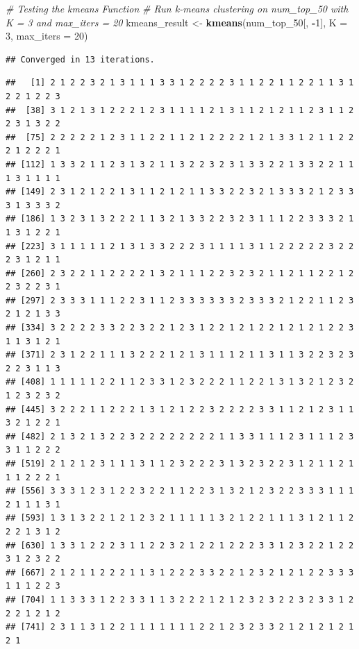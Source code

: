 \documentclass[
]{article}
\newenvironment{Shaded}{\begin{snugshade}}{\end{snugshade}}
\newcommand{\AttributeTok}[1]{\textcolor[rgb]{0.13,0.29,0.53}{#1}}
\newcommand{\CommentTok}[1]{\textcolor[rgb]{0.56,0.35,0.01}{\textit{#1}}}
\newcommand{\DecValTok}[1]{\textcolor[rgb]{0.00,0.00,0.81}{#1}}
\newcommand{\FunctionTok}[1]{\textcolor[rgb]{0.13,0.29,0.53}{\textbf{#1}}}
\newcommand{\NormalTok}[1]{#1}
\newcommand{\OtherTok}[1]{\textcolor[rgb]{0.56,0.35,0.01}{#1}}
\newcommand{\SpecialCharTok}[1]{\textcolor[rgb]{0.81,0.36,0.00}{\textbf{#1}}}
\begin{document}
\begin{Shaded}
\begin{Highlighting}[]
\CommentTok{\# Testing the kmeans Function}
\CommentTok{\# Run k{-}means clustering on num\_top\_50 with K = 3 and max\_iters = 20}
\NormalTok{kmeans\_result }\OtherTok{\textless{}{-}} \FunctionTok{kmeans}\NormalTok{(num\_top\_50[, }\SpecialCharTok{{-}}\DecValTok{1}\NormalTok{], }\AttributeTok{K =} \DecValTok{3}\NormalTok{, }\AttributeTok{max\_iters =} \DecValTok{20}\NormalTok{)}
\end{Highlighting}
\end{Shaded}

\begin{verbatim}
## Converged in 13 iterations.
\end{verbatim}

\begin{Shaded}
\end{Shaded}

\begin{verbatim}
##   [1] 2 1 2 2 3 2 1 3 1 1 1 3 3 1 2 2 2 2 3 1 1 2 2 1 1 2 2 1 1 3 1 2 2 1 2 2 3
##  [38] 3 1 2 1 3 1 2 2 2 1 2 3 1 1 1 1 2 1 3 1 1 2 1 2 1 1 2 3 1 1 2 2 3 1 3 2 2
##  [75] 2 2 2 2 2 1 2 3 1 1 2 2 1 1 2 1 2 2 2 2 1 2 1 3 3 1 2 1 1 2 2 2 1 2 2 2 1
## [112] 1 3 3 2 1 1 2 3 1 3 2 1 1 3 2 2 3 2 3 1 3 3 2 2 1 3 3 2 2 1 1 1 3 1 1 1 1
## [149] 2 3 1 2 1 2 2 1 3 1 1 2 1 2 1 1 3 3 2 2 3 2 1 3 3 3 2 1 2 3 3 3 1 3 3 3 2
## [186] 1 3 2 3 1 3 2 2 2 1 1 3 2 1 3 3 2 2 3 2 3 1 1 1 2 2 3 3 3 2 1 1 3 1 2 2 1
## [223] 3 1 1 1 1 1 2 1 3 1 3 3 2 2 2 3 1 1 1 1 3 1 1 2 2 2 2 2 3 2 2 2 3 1 2 1 1
## [260] 2 3 2 2 1 1 2 2 2 2 1 3 2 1 1 1 2 2 3 2 3 2 1 1 2 1 1 2 2 1 2 2 3 2 2 3 1
## [297] 2 3 3 3 1 1 1 2 2 3 1 1 2 3 3 3 3 3 3 2 3 3 3 2 1 2 2 1 1 2 3 2 1 2 1 3 3
## [334] 3 2 2 2 2 3 3 2 2 3 2 2 1 2 3 1 2 2 1 2 1 2 2 1 2 1 2 1 2 2 3 1 1 3 1 2 1
## [371] 2 3 1 2 2 1 1 1 3 2 2 2 1 2 1 3 1 1 1 2 1 1 3 1 1 3 2 2 3 2 3 2 2 3 1 1 3
## [408] 1 1 1 1 1 2 2 1 1 2 3 3 1 2 3 2 2 2 1 1 2 2 1 3 1 3 2 1 2 3 2 1 2 3 2 3 2
## [445] 3 2 2 2 1 1 2 2 2 1 3 1 2 1 2 2 3 2 2 2 2 3 3 1 1 2 1 2 3 1 1 3 2 1 2 2 1
## [482] 2 1 3 2 1 3 2 2 3 2 2 2 2 2 2 2 2 1 1 3 3 1 1 1 2 3 1 1 1 2 3 3 1 1 2 2 2
## [519] 2 1 2 1 2 3 1 1 1 3 1 1 2 3 2 2 2 3 1 3 2 3 2 2 3 1 2 1 1 2 1 1 1 2 2 2 1
## [556] 3 3 3 1 2 3 1 2 2 3 2 2 1 1 2 2 3 1 3 2 1 2 3 2 2 3 3 3 1 1 1 2 1 1 1 3 1
## [593] 1 3 1 3 2 2 1 2 1 2 3 2 1 1 1 1 1 3 2 1 2 2 1 1 1 3 1 2 1 1 2 2 2 1 3 1 2
## [630] 1 3 3 1 2 2 2 3 1 1 2 2 3 2 1 2 2 1 2 2 2 3 3 1 2 3 2 2 1 2 2 3 1 2 3 2 2
## [667] 2 1 2 1 1 2 2 2 1 1 3 1 2 2 2 3 3 2 2 1 2 3 2 1 2 1 2 2 3 3 3 1 1 1 2 2 3
## [704] 1 1 3 3 3 1 2 2 3 3 1 1 3 2 2 2 1 2 1 2 3 2 3 2 2 3 2 3 3 1 2 2 2 1 2 1 2
## [741] 2 3 1 1 3 1 2 2 1 1 1 1 1 1 1 2 2 1 2 3 2 3 3 2 1 2 1 2 1 2 1 2 1
\end{verbatim}
\end{document}
